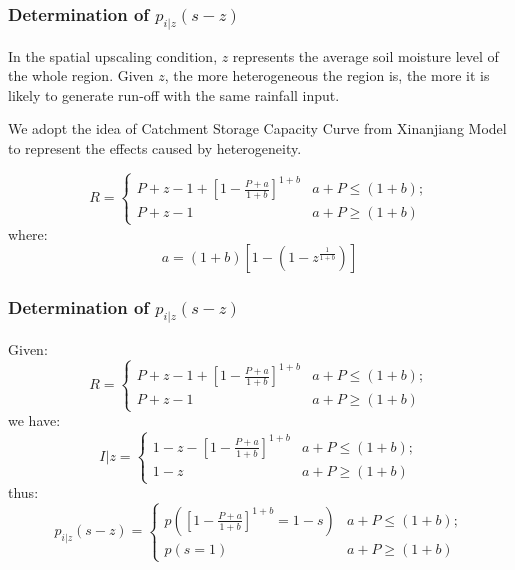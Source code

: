 \documentclass{beamer}
\begin{document}
\begin{frame}
\frametitle{Determination of $p_{i|z}(s-z)$}
In the spatial upscaling condition, $z$ represents the average soil moisture level of the whole region. Given $z$, the more heterogeneous the region is, the more it is likely to generate run-off with the same rainfall input. 

We adopt the idea of Catchment Storage Capacity Curve from Xinanjiang Model to represent the effects caused by heterogeneity.
\end{frame}
\begin{frame}
\begin{equation}
R=
 \begin{cases}
 P+z-1+[1-\frac{P+a}{1+b}]^{1+b}&{a+P\leq (1+b)};\\P+z-1 &{a+P\geq (1+b)}
 \end{cases}
\end{equation}
where:
\begin{equation}
a=(1+b)[1-(1-z^{\frac{1}{1+b}})]
\end{equation}
\end{frame}
\begin{frame}
\frametitle{Determination of $p_{i|z}(s-z)$}
Given:
\begin{equation}
R=
 \begin{cases}
 P+z-1+[1-\frac{P+a}{1+b}]^{1+b}&{a+P\leq (1+b)};\\P+z-1 &{a+P\geq (1+b)}
 \end{cases}
\end{equation}
we have:
\begin{equation}
I\vert z=
 \begin{cases}
 1-z-[1-\frac{P+a}{1+b}]^{1+b}&{a+P\leq (1+b)};\\1-z &{a+P\geq (1+b)}
 \end{cases}
\end{equation}
thus:
\begin{equation}
p_{i|z}(s-z)=
 \begin{cases}
 p([1-\frac{P+a}{1+b}]^{1+b}=1-s)&{a+P\leq (1+b)};\\p(s=1) &{a+P\geq (1+b)}
 \end{cases}
\end{equation}
\end{frame}
\end{document}
